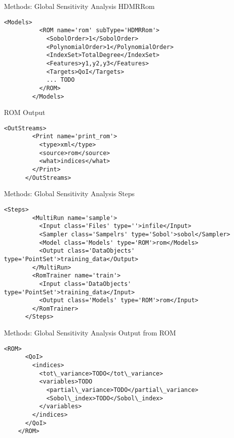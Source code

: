 \documentclass[t,9pt,svgnames]{beamer}
\newenvironment{codebox}{}{}
\begin{document}
\begin{frame}[fragile]{Methods: Global Sensitivity Analysis}
  HDMRRom
  \begin{codebox}
    \begin{lstlisting}[emph={SobolOrder}]
        <Models>
          <ROM name='rom' subType='HDMRRom'>
            <SobolOrder>1</SobolOrder>
            <PolynomialOrder>1</PolynomialOrder>
            <IndexSet>TotalDegree</IndexSet>
            <Features>y1,y2,y3</Features>
            <Targets>QoI</Targets>
            ... TODO
          </ROM>
        </Models>
    \end{lstlisting}
  \end{codebox}
  ROM Output
  \begin{codebox}
    \begin{lstlisting}[emph={print\_rom,rom}]
      <OutStreams>
        <Print name='print_rom'>
          <type>xml</type>
          <source>rom</source>
          <what>indices</what>
        </Print>
      </OutStreams>
    \end{lstlisting}
  \end{codebox}
\end{frame}

\begin{frame}[fragile]{Methods: Global Sensitivity Analysis}
  Steps
  \begin{codebox}
    \begin{lstlisting}[emph={MultiRun,rom,sobol,RomTrainer,training\_data,rom}]
      <Steps>
        <MultiRun name='sample'>
          <Input class='Files' type=''>infile</Input>
          <Sampler class='Sampelrs' type='Sobol'>sobol</Sampler>
          <Model class='Models' type='ROM'>rom</Models>
          <Output class='DataObjects' type='PointSet'>training_data</Output>
        </MultiRun>
        <RomTrainer name='train'>
          <Input class='DataObjects' type='PointSet'>training_data</Input>
          <Output class='Models' type='ROM'>rom</Input>
        </RomTrainer>
      </Steps>
    \end{lstlisting}
  \end{codebox}
\end{frame}

\begin{frame}[fragile]{Methods: Global Sensitivity Analysis}
  Output from ROM
  \begin{codebox}
    \begin{lstlisting}[emph={indices}]
    <ROM>
      <QoI>
        <indices>
          <tot\_variance>TODO</tot\_variance>
          <variables>TODO
            <partial\_variance>TODO</partial\_variance>
            <Sobol\_index>TODO</Sobol\_index>
          </variables>
        </indices>
      </QoI>
    </ROM>
    \end{lstlisting}
  \end{codebox}
\end{frame}
\end{document}
